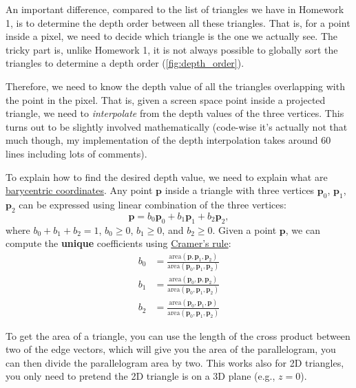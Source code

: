 An important difference, compared to the list of triangles we have in Homework 1, is to determine the depth order between all these triangles. That is, for a point inside a pixel, we need to decide which triangle is the one we actually see. The tricky part is, unlike Homework 1, it is not always possible to globally sort the triangles to determine a depth order (\cref{fig:depth_order}).

Therefore, we need to know the depth value of all the triangles overlapping with the point in the pixel. That is, given a screen space point inside a projected triangle, we need to \emph{interpolate} from the depth values of the three vertices. This turns out to be slightly involved mathematically (code-wise it's actually not that much though, my implementation of the depth interpolation takes around 60 lines including lots of comments). 

To explain how to find the desired depth value, we need to explain what are \href{https://en.wikipedia.org/wiki/Barycentric_coordinate_system}{barycentric coordinates}. Any point $\mathbf{p}$ inside a triangle with three vertices $\mathbf{p}_0$, $\mathbf{p}_1$, $\mathbf{p}_2$ can be expressed using linear combination of the three vertices:
\begin{equation}
\mathbf{p} = b_0 \mathbf{p}_0 + b_1 \mathbf{p}_1 + b_2 \mathbf{p}_2,
\end{equation}
where $b_0 + b_1 + b_2 = 1$, $b_0 \geq 0$, $b_1 \geq 0$, and $b_2 \geq 0$. Given a point $\mathbf{p}$, we can compute the \textbf{unique} coefficients using \href{https://en.wikipedia.org/wiki/Cramer%27s_rule}{Cramer's rule}:
\begin{equation}
\begin{aligned}
b_0 &= \frac{\text{area}\left(\mathbf{p}, \mathbf{p}_1, \mathbf{p}_2\right)}{\text{area}\left(\mathbf{p}_0, \mathbf{p}_1, \mathbf{p}_2\right)} \\
b_1 &= \frac{\text{area}\left(\mathbf{p}_0, \mathbf{p}, \mathbf{p}_2\right)}{\text{area}\left(\mathbf{p}_0, \mathbf{p}_1, \mathbf{p}_2\right)} \\
b_2 &= \frac{\text{area}\left(\mathbf{p}_0, \mathbf{p}_1, \mathbf{p}\right)}{\text{area}\left(\mathbf{p}_0, \mathbf{p}_1, \mathbf{p}_2\right)}
\end{aligned}
\label{eq:barycentric_solve}
\end{equation}

To get the area of a triangle, you can use the length of the cross product between two of the edge vectors, which will give you the area of the parallelogram, you can then divide the parallelogram area by two. This works also for 2D triangles, you only need to pretend the 2D triangle is on a 3D plane (e.g., $z=0$).

